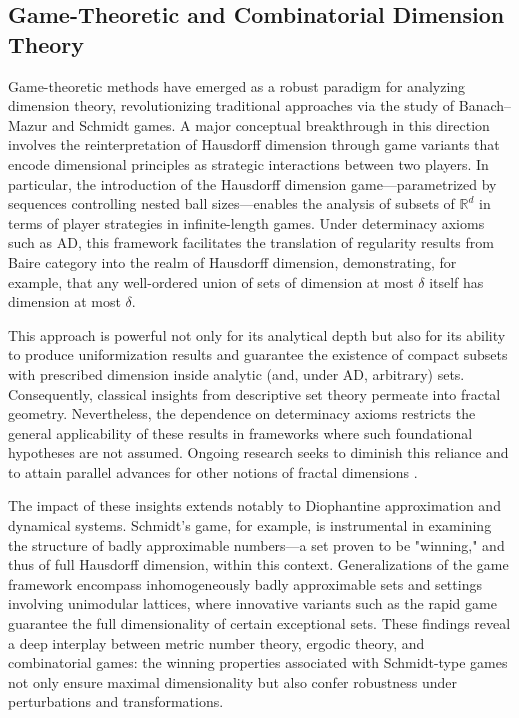 \subsection{Game-Theoretic and Combinatorial Dimension Theory}

Game-theoretic methods have emerged as a robust paradigm for analyzing dimension theory, revolutionizing traditional approaches via the study of Banach–Mazur and Schmidt games. A major conceptual breakthrough in this direction involves the reinterpretation of Hausdorff dimension through game variants that encode dimensional principles as strategic interactions between two players. In particular, the introduction of the Hausdorff dimension game—parametrized by sequences controlling nested ball sizes—enables the analysis of subsets of $\mathbb{R}^d$ in terms of player strategies in infinite-length games. Under determinacy axioms such as AD, this framework facilitates the translation of regularity results from Baire category into the realm of Hausdorff dimension, demonstrating, for example, that any well-ordered union of sets of dimension at most $\delta$ itself has dimension at most $\delta$. 

This approach is powerful not only for its analytical depth but also for its ability to produce uniformization results and guarantee the existence of compact subsets with prescribed dimension inside analytic (and, under AD, arbitrary) sets. Consequently, classical insights from descriptive set theory permeate into fractal geometry. Nevertheless, the dependence on determinacy axioms restricts the general applicability of these results in frameworks where such foundational hypotheses are not assumed. Ongoing research seeks to diminish this reliance and to attain parallel advances for other notions of fractal dimensions \cite{ref77}.

The impact of these insights extends notably to Diophantine approximation and dynamical systems. Schmidt's game, for example, is instrumental in examining the structure of badly approximable numbers—a set proven to be "winning," and thus of full Hausdorff dimension, within this context. Generalizations of the game framework encompass inhomogeneously badly approximable sets and settings involving unimodular lattices, where innovative variants such as the rapid game guarantee the full dimensionality of certain exceptional sets. These findings reveal a deep interplay between metric number theory, ergodic theory, and combinatorial games: the winning properties associated with Schmidt-type games not only ensure maximal dimensionality but also confer robustness under perturbations and transformations. 

